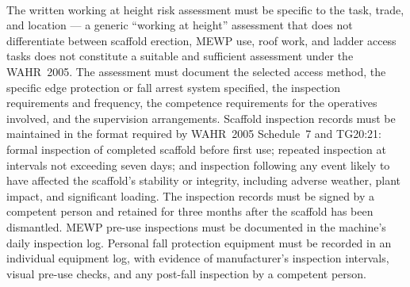 \paragraph{}
The written working at height risk assessment must be specific to the task, trade, and location --- a generic ``working at height'' assessment that does not differentiate between scaffold erection, MEWP use, roof work, and ladder access tasks does not constitute a suitable and sufficient assessment under the WAHR~2005. The assessment must document the selected access method, the specific edge protection or fall arrest system specified, the inspection requirements and frequency, the competence requirements for the operatives involved, and the supervision arrangements. Scaffold inspection records must be maintained in the format required by WAHR~2005 Schedule~7 and TG20:21: formal inspection of completed scaffold before first use; repeated inspection at intervals not exceeding seven days; and inspection following any event likely to have affected the scaffold's stability or integrity, including adverse weather, plant impact, and significant loading. The inspection records must be signed by a competent person and retained for three months after the scaffold has been dismantled. MEWP pre-use inspections must be documented in the machine's daily inspection log. Personal fall protection equipment must be recorded in an individual equipment log, with evidence of manufacturer's inspection intervals, visual pre-use checks, and any post-fall inspection by a competent person.

